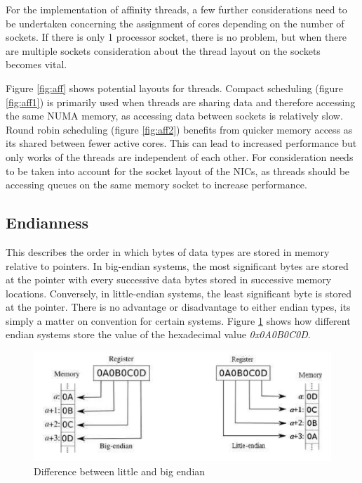 \documentclass[final_report.tex]{subfiles}
\begin{document}
For the implementation of affinity threads, a few further considerations need to be undertaken concerning the assignment of cores depending on the number of sockets. If there is only 1 processor socket, there is no problem, but when there are multiple sockets consideration about the thread layout on the sockets becomes vital.

Figure \ref{fig:aff} shows potential layouts for threads. Compact scheduling (figure \ref{fig:aff1}) is primarily used when threads are sharing data and therefore accessing the same NUMA memory, as accessing data between sockets is relatively slow. Round robin scheduling (figure \ref{fig:aff2}) benefits from quicker memory access as its shared between fewer active cores. This can lead to increased performance but only works of the threads are independent of each other. For consideration needs to be taken into account for the socket layout of the NICs, as threads should be accessing queues on the same memory socket to increase performance.

\subsection{Endianness}
This describes the order in which bytes of data types are stored in memory relative to pointers. In big-endian systems, the most significant bytes are stored at the pointer with every successive data bytes stored in successive memory locations. Conversely, in little-endian systems, the least significant byte is stored at the pointer. There is no advantage or disadvantage to either endian types, its simply a matter on convention for certain systems. Figure \ref{fig:endian} shows how different endian systems store the value of the hexadecimal value \textit{0x0A0B0C0D}. 

\begin{figure}[H]
	\centering
	\includegraphics[width=\textwidth]{img/endian.png}
	\caption{Difference between little and big endian}
	\label{fig:endian}
\end{figure}
\end{document}
